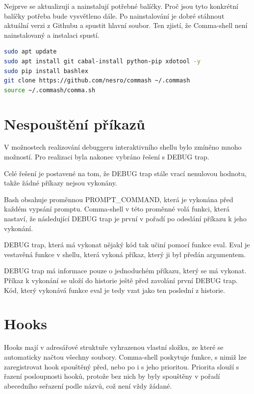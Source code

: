 \documentclass[thesis=M,czech]{FITthesis}[2012/06/26]
\begin{document}
Nejprve se aktualizují a nainstalují potřebné balíčky. Proč jsou tyto konkrétní balíčky potřeba bude vysvětleno dále. Po nainstalování je dobré stáhnout aktuální verzi z Githubu a spustit hlavní soubor. Ten zjistí, že Comma-shell není nainstalovaný a instalaci spustí.

\begin{minipage}{\linewidth}
\begin{lstlisting}[language=bash, caption={Instalace Comma-shellu}, label={lst:csinstall}]
sudo apt update
sudo apt install git cabal-install python-pip xdotool -y
sudo pip install bashlex
git clone https://github.com/nesro/commash ~/.commash
source ~/.commash/comma.sh
\end{lstlisting}
\end{minipage}



%
%
%
%
%
\section{Nespouštění příkazů}\label{sec:debugtraprealization}
V možnostech realizování debuggeru interaktivního shellu bylo zmíněno mnoho možností. Pro realizaci byla nakonec vybráno řešení s DEBUG trap.

Celé řešení je postavené na tom, že DEBUG trap stále vrací nenulovou hodnotu, takže žádné příkazy nejsou vykonány.

Bash obsahuje proměnnou PROMPT\_COMMAND, která je vykonána před každém vypsání promptu. Comma-shell v této proměnné volá funkci, která nastaví, že následující DEBUG trap je první v pořadí po odeslání příkazu k jeho vykonání.

DEBUG trap, která má vykonat nějaký kód tak učiní pomocí funkce eval. Eval je vestavěná funkce v shellu, která vykoná příkaz, který ji byl předán argumentem.

DEBUG trap má informace pouze o jednoduchém příkazu, který se má vykonat. Příkaz k vykonání se uloží do historie ještě před zavolání první DEBUG trap. Kód, který vykonává funkce eval je tedy vzat jako ten poslední z historie.



%
%
%
%
%
\section{Hooks}

Hooks mají v adresářové struktuře vyhrazenou vlastní složku, ze které se automaticky načtou všechny soubory. Comma-shell poskytuje funkce, s nimiž lze zaregistrovat hook spouštěný před, nebo po i s jeho prioritou. Priorita slouží s řazení posloupnosti hooků, protože bez nich by byly spouštěny v pořadí abecedního seřazení podle názvů, což není vždy žádané.
\end{document}
